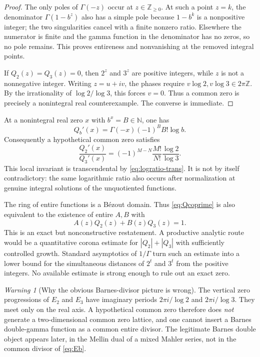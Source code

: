 \documentclass[11pt]{article}
\numberwithin{equation}{section}
\theoremstyle{definition}
\theoremstyle{remark}
\newtheorem{warning}[theorem]{Warning}
\newcommand{\Z}{\mathbb{Z}}
\newcommand{\N}{\mathbb{N}}
\begin{document}
\begin{proof}
The only poles of $\Gamma(-z)$ occur at $z\in\Z_{\ge0}$.  At such a point $z=k$, the denominator $\Gamma(1-b^z)$ also has a simple pole because $1-b^k$ is a nonpositive integer; the two singularities cancel with a finite nonzero ratio.  Elsewhere the numerator is finite and the gamma function in the denominator has no zeros, so no pole remains.  This proves entireness and nonvanishing at the removed integral points.

If $Q_2(z)=Q_3(z)=0$, then $2^z$ and $3^z$ are positive integers, while $z$ is not a nonnegative integer.  Writing $z=u+iv$, the phases require $v\log2, v\log3\in2\pi\Z$.  By the irrationality of $\log2/\log3$, this forces $v=0$.  Thus a common zero is precisely a nonintegral real counterexample.  The converse is immediate.
\end{proof}

At a nonintegral real zero $x$ with $b^x=B\in\N$, one has
\begin{equation}
 Q_b'(x)=\Gamma(-x)(-1)^B B!\log b.
 \label{eq:Qderivative}
\end{equation}
Consequently a hypothetical common zero satisfies
\begin{equation}
 \frac{Q_2'(x)}{Q_3'(x)}
 =(-1)^{M-N}\frac{M!}{N!}\frac{\log2}{\log3}.
 \label{eq:derivative-ratio}
\end{equation}
This local invariant is transcendental by \eqref{eq:logratio-trans}.  It is not by itself contradictory: the same logarithmic ratio also occurs after normalization at genuine integral solutions of the unquotiented functions.

The ring of entire functions is a B\'ezout domain.  Thus \eqref{eq:Qcoprime} is also equivalent to the existence of entire $A,B$ with
\begin{equation}
 A(z)Q_2(z)+B(z)Q_3(z)=1.
 \label{eq:entire-bezout}
\end{equation}
This is an exact but nonconstructive restatement.  A productive analytic route would be a quantitative corona estimate for $|Q_2|+|Q_3|$ with sufficiently controlled growth.  Standard asymptotics of $1/\Gamma$ turn such an estimate into a lower bound for the simultaneous distances of $2^t$ and $3^t$ from the positive integers.  No available estimate is strong enough to rule out an exact zero.

\begin{warning}[Why the obvious Barnes-divisor picture is wrong]
The vertical zero progressions of $E_2$ and $E_3$ have imaginary periods $2\pi i/\log2$ and $2\pi i/\log3$.  They meet only on the real axis.  A hypothetical common zero therefore does \emph{not} generate a two-dimensional common zero lattice, and one cannot insert a Barnes double-gamma function as a common entire divisor.  The legitimate Barnes double object appears later, in the Mellin dual of a mixed Mahler series, not in the common divisor of \eqref{eq:Eb}.
\end{warning}
\end{document}
